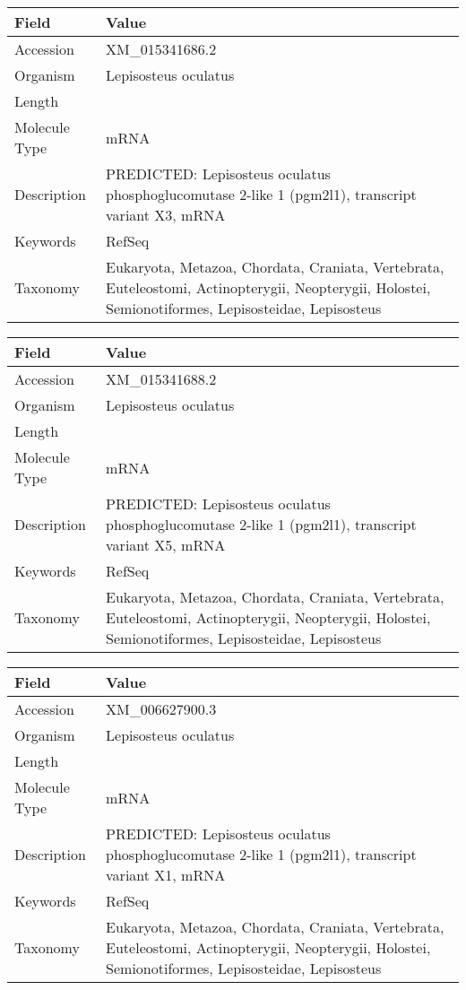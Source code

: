 \documentclass[10pt]{article}
\begin{document}
\vspace{1em}
{\footnotesize
\begin{longtable}{>{\raggedright\arraybackslash}p{4.5cm} >{\raggedright\arraybackslash}p{11.5cm}}
\textbf{Field} & \textbf{Value} \\
\hline
Accession & XM\_015341686.2 \\
Organism & Lepisosteus oculatus \\
Length & 7094 \\
Molecule Type & mRNA \\
Description & PREDICTED: Lepisosteus oculatus phosphoglucomutase 2-like 1 (pgm2l1), transcript variant X3, mRNA \\
Keywords & RefSeq \\
Taxonomy & Eukaryota, Metazoa, Chordata, Craniata, Vertebrata, Euteleostomi, Actinopterygii, Neopterygii, Holostei, Semionotiformes, Lepisosteidae, Lepisosteus \\
\end{longtable}
}

\vspace{1em}
{\footnotesize
\begin{longtable}{>{\raggedright\arraybackslash}p{4.5cm} >{\raggedright\arraybackslash}p{11.5cm}}
\textbf{Field} & \textbf{Value} \\
\hline
Accession & XM\_015341688.2 \\
Organism & Lepisosteus oculatus \\
Length & 6984 \\
Molecule Type & mRNA \\
Description & PREDICTED: Lepisosteus oculatus phosphoglucomutase 2-like 1 (pgm2l1), transcript variant X5, mRNA \\
Keywords & RefSeq \\
Taxonomy & Eukaryota, Metazoa, Chordata, Craniata, Vertebrata, Euteleostomi, Actinopterygii, Neopterygii, Holostei, Semionotiformes, Lepisosteidae, Lepisosteus \\
\end{longtable}
}

\vspace{1em}
{\footnotesize
\begin{longtable}{>{\raggedright\arraybackslash}p{4.5cm} >{\raggedright\arraybackslash}p{11.5cm}}
\textbf{Field} & \textbf{Value} \\
\hline
Accession & XM\_006627900.3 \\
Organism & Lepisosteus oculatus \\
Length & 7274 \\
Molecule Type & mRNA \\
Description & PREDICTED: Lepisosteus oculatus phosphoglucomutase 2-like 1 (pgm2l1), transcript variant X1, mRNA \\
Keywords & RefSeq \\
Taxonomy & Eukaryota, Metazoa, Chordata, Craniata, Vertebrata, Euteleostomi, Actinopterygii, Neopterygii, Holostei, Semionotiformes, Lepisosteidae, Lepisosteus \\
\end{longtable}
}
\end{document}
